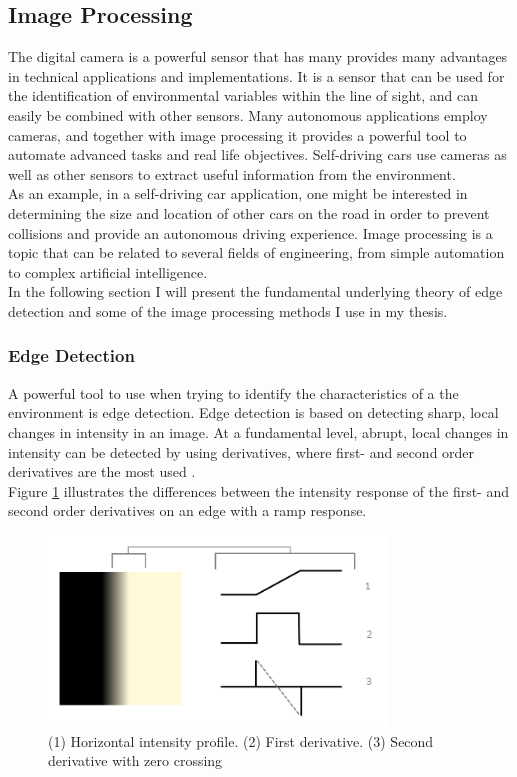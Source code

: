 \subsection{Image Processing}
The digital camera is a powerful sensor that has many provides many advantages in technical applications and implementations. It is a sensor that can be used for the identification of environmental variables within the line of sight, and can easily be combined with other sensors. Many autonomous applications employ cameras, and together with image processing it provides a powerful tool to automate advanced tasks and real life objectives. Self-driving cars\cite{tesla} use cameras as well as other sensors to extract useful information from the environment.\\

As an example, in a self-driving car application, one might be interested in determining the size and location of other cars on the road in order to prevent collisions and provide an autonomous driving experience. Image processing is a topic that can be related to several fields of engineering, from simple automation to complex artificial intelligence.\\

In the following section I will present the fundamental underlying theory of edge detection and some of the image processing methods I use in my thesis.

\subsubsection{Edge Detection}
A powerful tool to use when trying to identify the characteristics of a the environment is edge detection. Edge detection is based on detecting sharp, local changes in intensity in an image. At a fundamental level, abrupt, local changes in intensity can be detected by using derivatives, where first- and second order derivatives are the most used \cite{g}. \\

Figure \ref{fig:derivatives} illustrates the differences between the intensity response of the first- and second order derivatives on an edge with a ramp response.

\begin{figure}[h]
  \centering
  \includegraphics[width=0.8\textwidth]{fig/derivatives}
  \caption{(1) Horizontal intensity profile. (2) First derivative. (3) Second derivative with zero crossing}
  \label{fig:derivatives}
\end{figure}

